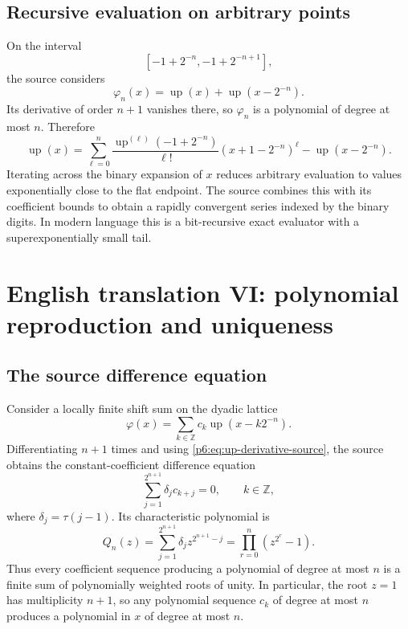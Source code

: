 \documentclass[11pt,oneside]{article}
\numberwithin{equation}{section}
\theoremstyle{definition}
\theoremstyle{remark}
\newcommand{\Z}{\mathbb Z}
\newcommand{\Up}{\operatorname{up}}
\begin{document}
\subsection{Recursive evaluation on arbitrary points}

On the interval
\[
 [-1+2^{-n},-1+2^{-n+1}],
\]
the source considers
\[
 \varphi_n(x)=\Up(x)+\Up(x-2^{-n}).
\]
Its derivative of order $n+1$ vanishes there, so $\varphi_n$ is a polynomial of
degree at most $n$.  Therefore
\begin{equation}\label{p6:eq:up-recursive-cell}
 \Up(x)=
 \sum_{\ell=0}^{n}
 \frac{\Up^{(\ell)}(-1+2^{-n})}{\ell!}
 (x+1-2^{-n})^\ell
 -\Up(x-2^{-n}).
\end{equation}
Iterating across the binary expansion of $x$ reduces arbitrary evaluation to
values exponentially close to the flat endpoint.  The source combines this
with its coefficient bounds to obtain a rapidly convergent series indexed by the
binary digits.  In modern language this is a bit-recursive exact evaluator with
a superexponentially small tail.

\section{English translation VI: polynomial reproduction and uniqueness}

\subsection{The source difference equation}

Consider a locally finite shift sum on the dyadic lattice
\begin{equation}\label{p6:eq:source-shift-sum}
 \varphi(x)=\sum_{k\in\Z}c_k\Up(x-k2^{-n}).
\end{equation}
Differentiating $n+1$ times and using
\eqref{p6:eq:up-derivative-source}, the source obtains the constant-coefficient
difference equation
\begin{equation}\label{p6:eq:source-difference}
 \sum_{j=1}^{2^{n+1}}\delta_j c_{k+j}=0,
 \qquad k\in\Z,
\end{equation}
where $\delta_j=\tau(j-1)$.  Its characteristic polynomial is
\begin{equation}\label{p6:eq:Qn}
 Q_n(z)=\sum_{j=1}^{2^{n+1}}\delta_j z^{2^{n+1}-j}
 =\prod_{r=0}^{n}(z^{2^r}-1).
\end{equation}
Thus every coefficient sequence producing a polynomial of degree at most $n$
is a finite sum of polynomially weighted roots of unity.  In particular, the
root $z=1$ has multiplicity $n+1$, so any polynomial sequence $c_k$ of degree at
most $n$ produces a polynomial in $x$ of degree at most $n$.
\end{document}
